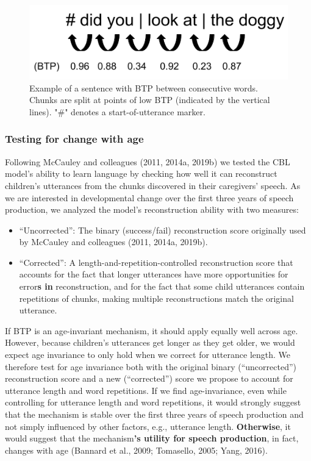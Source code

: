\documentclass[
  english,
  man,mask,floatsintext]{apa6}
\providecommand{\tightlist}{%
  \setlength{\itemsep}{0pt}\setlength{\parskip}{0pt}}
\begin{document}
\begin{figure}
\includegraphics[width=0.75\linewidth]{images/chunking_mechanism} \caption{Example of a sentence with BTP between consecutive words. Chunks are split at points of low BTP (indicated by the vertical lines). "\#" denotes a start-of-utterance marker.}\label{fig:fig1}
\end{figure}

\hypertarget{testing-for-change-with-age}{%
\subsubsection{\texorpdfstring{\textbf{Testing for change with age}}{Testing for change with age}}\label{testing-for-change-with-age}}

Following McCauley and colleagues (2011, 2014a, 2019b) we tested the CBL model's ability to learn language by checking how well it can reconstruct children's utterances from the chunks discovered in their caregivers' speech. As we are interested in developmental change over the first three years of speech production, we analyzed the model's reconstruction ability with two measures:

\begin{itemize}
\tightlist
\item
  \enquote{Uncorrected}: The binary (success/fail) reconstruction score originally used by McCauley and colleagues (2011, 2014a, 2019b).
\item
  \enquote{Corrected}: A length-and-repetition-controlled reconstruction score that accounts for the fact that longer utterances have more opportunities for error\textbf{s in} reconstruction, and for the fact that some child utterances contain repetitions of chunks, making multiple reconstructions match the original utterance.
\end{itemize}

If BTP is an age-invariant mechanism, it should apply equally well across age. However, because children's utterances get longer as they get older, we would expect age invariance to only hold when we correct for utterance length. We therefore test for age invariance both with the original binary (\enquote{uncorrected}) reconstruction score and a new (\enquote{corrected}) score we propose to account for utterance length and word repetitions. If we find age-invariance, even while controlling for utterance length and word repetitions, it would strongly suggest that the mechanism is stable over the first three years of speech production and not simply influenced by other factors, e.g., utterance length. \textbf{Otherwise}, it would suggest that the mechanism\textbf{'s utility for speech production}, in fact, changes with age (Bannard et al., 2009; Tomasello, 2005; Yang, 2016).
\end{document}
